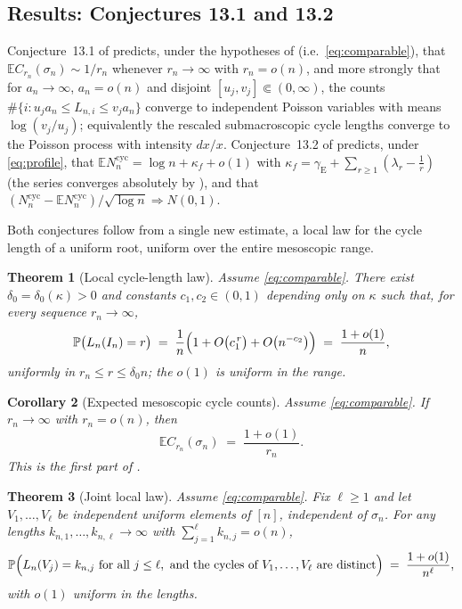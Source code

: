 \documentclass[11pt]{article}
\newcommand{\E}{\mathbb{E}}
\newcommand{\Prob}{\mathbb{P}}
\newcommand{\1}{\mathbf{1}}
\newcommand{\cyc}{\mathrm{cyc}}
\newcommand{\gE}{\gamma_{\mathrm{E}}}
\newtheorem{theorem}{Theorem}[section]
\newtheorem{corollary}[theorem]{Corollary}
\theoremstyle{remark}
\begin{document}
\subsection{Results: Conjectures 13.1 and 13.2}
Conjecture~13.1 of \cite{Lon26} predicts, under the hypotheses of
\cite[Theorem~6.1]{Lon26} (i.e.\ \eqref{eq:comparable}), that
$\E C_{r_n}(\sigma_n)\sim 1/r_n$ whenever $r_n\to\infty$ with
$r_n=o(n)$, and more strongly that for $a_n\to\infty$, $a_n=o(n)$ and
disjoint $[u_j,v_j]\Subset(0,\infty)$, the counts
$\#\{i:u_ja_n\le L_{n,i}\le v_ja_n\}$ converge to independent Poisson
variables with means $\log(v_j/u_j)$; equivalently the rescaled
submacroscopic cycle lengths converge to the Poisson process with
intensity $dx/x$. Conjecture~13.2 of \cite{Lon26} predicts, under
\eqref{eq:profile}, that $\E N_n^{\cyc}=\log n+\kappa_f+o(1)$ with
$\kappa_f=\gE+\sum_{r\ge1}(\lambda_r-\frac1r)$ (the series converges
absolutely by \cite[Theorem~5.19]{Lon26}), and that
$(N_n^{\cyc}-\E N_n^{\cyc})/\sqrt{\log n}\Rightarrow N(0,1)$.

Both conjectures follow from a single new estimate, a local law for
the cycle length of a uniform root, uniform over the entire mesoscopic
range.

\begin{theorem}[Local cycle-length law]\label{thm:local}
Assume \eqref{eq:comparable}. There exist $\delta_0=\delta_0(\kappa)>0$
and constants $c_1,c_2\in(0,1)$ depending only on $\kappa$ such that,
for every sequence $r_n\to\infty$,
\begin{equation}\label{eq:local-law}
\Prob\bigl(L_n(I_n)=r\bigr)
\;=\;\frac{1}{n}\Bigl(1+O\bigl(c_1^{\,r}\bigr)+O\bigl(n^{-c_2}\bigr)\Bigr)
\;=\;\frac{1+o(1)}{n},
\end{equation}
uniformly in $r_n\le r\le\delta_0 n$; the $o(1)$ is uniform in the
range.
\end{theorem}

\begin{corollary}[Expected mesoscopic cycle counts]\label{cor:EC}
Assume \eqref{eq:comparable}. If $r_n\to\infty$ with $r_n=o(n)$, then
\[
\E C_{r_n}(\sigma_n)\;=\;\frac{1+o(1)}{r_n}.
\]
This is the first part of \cite[Conjecture~13.1]{Lon26}.
\end{corollary}

\begin{theorem}[Joint local law]\label{thm:joint-local}
Assume \eqref{eq:comparable}. Fix $\ell\ge1$ and let
$V_1,\dots,V_\ell$ be independent uniform elements of $[n]$,
independent of $\sigma_n$. For any lengths
$k_{n,1},\dots,k_{n,\ell}\to\infty$ with
$\sum_{j=1}^\ell k_{n,j}=o(n)$,
\begin{equation}\label{eq:joint-local}
\Prob\Bigl(L_n(V_j)=k_{n,j}\ \text{for all }j\le\ell,\ \text{and the
cycles of }V_1,\dots,V_\ell\text{ are distinct}\Bigr)
\;=\;\frac{1+o(1)}{n^\ell},
\end{equation}
with $o(1)$ uniform in the lengths.
\end{theorem}
\end{document}
